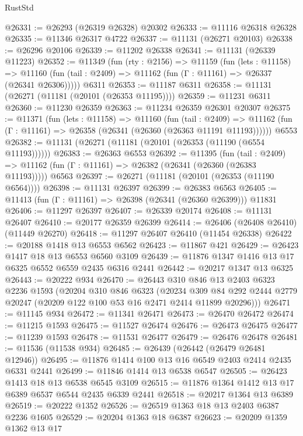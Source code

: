 \begin{lexlean}{RustStd}
\begin{coremodule}
@26331 := @26293 (@26319 @26328) @20302
@26333 := @11116 @26318 @26328
@26335 := @11346 @26317 @4722
@26337 := @11131 (@26271 @20103)
@26338 := @26296 @20106
@26339 := @11202 @26338
@26341 := @11131 (@26339 @11223)
@26352 := @11349
    (fun (rty : @2156) =>
    @11159
      (fun (lets : @11158) =>
      @11160 (fun (tail : @2409) => @11162 (fun (Γ : @11161) => @26337 (@26341 @26306)))))
    @6311
@26353 := @11187 @6311
@26358 := @11131 (@26271 (@11181 (@20101 (@26353 @11195))))
@26359 := @11231 @6311
@26360 := @11230 @26359
@26363 := @11234 @26359 @26301 @20307
@26375 := @11371
    (fun (lets : @11158) =>
    @11160
      (fun (tail : @2409) =>
      @11162 (fun (Γ : @11161) => @26358 (@26341 (@26360 (@26363 @11191 @11193))))))
    @6553
@26382 := @11131 (@26271 (@11181 (@20101 (@26353 (@11190 (@6554 @11193))))))
@26383 := @26363 @6553
@26392 := @11395
    (fun (tail : @2409) => @11162 (fun (Γ : @11161) => @26382 (@26341 (@26360 (@26383 @11193)))))
    @6563
@26397 := @26271 (@11181 (@20101 (@26353 (@11190 @6564))))
@26398 := @11131 @26397
@26399 := @26383 @6563
@26405 := @11413 (fun (Γ : @11161) => @26398 (@26341 (@26360 @26399))) @11831
@26406 := @11297 @26397
@26407 := @26339 @20174
@26408 := @11131 @26407
@26410 := @20177 @26359 @26399
@26414 := @26406 (@26408 @26410) (@11449 @26270)
@26418 := @11297 @26407 @26410 (@11454 @26338)
@26422 := @20188 @1418 @13 @6553 @6562
@26423 := @11867 @421
@26429 := @26423 @1417 @18 @13 @6553 @6560 @3109
@26439 := @11876 @1347 @1416 @13 @17 @6325 @6552 @6559 @2435 @6316 @2441
@26442 := @20217 @1347 @13 @6325
@26443 := @20222 @934
@26470 := @26443
    @310
    @846
    @13
    @2403
    @6323
    @2236
    @1593
    (@20204
      @310
      @846
      @6323
      (@20234
        @309
        @84
        @292
        @2444
        @2779
        @20247
        (@20209 @122 @100 @53 @16 @2471 @2414 @11899 @20296)))
@26471 := @11145 @934
@26472 := @11341 @26471
@26473 := @26470 @26472
@26474 := @11215 @1593
@26475 := @11527 @26474
@26476 := @26473 @26475
@26477 := @11239 @1593
@26478 := @11531 @26477
@26479 := @26476 @26478
@26481 := @11536 (@11538 @934)
@26485 := @26439 (@26442 (@26479 @26481 @12946))
@26495 := @11876 @1414 @100 @13 @16 @6549 @2403 @2414 @2435 @6331 @2441
@26499 := @11846 @1414 @13 @6538 @6547
@26505 := @26423 @1413 @18 @13 @6538 @6545 @3109
@26515 := @11876 @1364 @1412 @13 @17 @6389 @6537 @6544 @2435 @6339 @2441
@26518 := @20217 @1364 @13 @6389
@26519 := @20222 @1352
@26526 := @26519 @1363 @18 @13 @2403 @6387 @2236 @1605
@26529 := @20204 @1363 @18 @6387
@26623 := @20209
    @1359
    @1362
    @13
    @17

\end{coremodule}
\end{lexlean}
